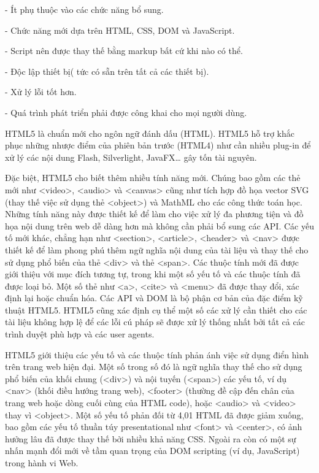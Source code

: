 \quad - Ít phụ thuộc vào các chức năng bổ sung.

\quad - Chức năng mới dựa trên HTML, CSS, DOM và JavaScript.

\quad - Script nên được thay thế bằng markup bất cứ khi nào có thể.

\quad - Độc lập thiết bị( tức có sẵn trên tất cả các thiết bị).

\quad - Xử lý lỗi tốt hơn.

\quad - Quá trình phát triển phải được công khai cho mọi người dùng.



HTML5 là chuẩn mới cho ngôn ngữ đánh dấu (HTML). HTML5 hỗ trợ khắc phục những nhược điểm của phiên bản trước (HTML4) như cần nhiều plug-in để xử lý các nội dung Flash, Silverlight, JavaFX… gây tốn tài nguyên.

Đặc biệt, HTML5 cho biết thêm nhiều tính năng mới. Chúng bao gồm các thẻ mới như <video>, <audio> và <canvas> cũng như tích hợp đồ họa vector SVG (thay thế việc sử dụng thẻ <object>) và MathML cho các công thức toán học. Những tính năng này được thiết kế để làm cho việc xử lý đa phương tiện và đồ họa nội dung trên web dễ dàng hơn mà không cần phải bổ sung các API. Các yếu tố mới khác, chẳng hạn như <section>, <article>, <header> và <nav> được thiết kế để làm phong phú thêm ngữ nghĩa nội dung của tài liệu và thay thế cho sử dụng phổ biến của thẻ <div> và thẻ <span>. Các thuộc tính mới đã được giới thiệu với mục đích tương tự, trong khi một số yếu tố và các thuộc tính đã được loại bỏ. Một số thẻ như <a>, <cite> và <menu> đã được thay đổi, xác định lại hoặc chuẩn hóa. Các API và DOM là bộ phận cơ bản của đặc điểm kỹ thuật HTML5. HTML5 cũng xác định cụ thể một số các xử lý cần thiết cho các tài liệu không hợp lệ để các lỗi cú pháp sẽ được xử lý thống nhất bởi tất cả các trình duyệt phù hợp và các user agents.

HTML5 giới thiệu các yếu tố và các thuộc tính phản ánh việc sử dụng điển hình trên trang web hiện đại. Một số trong số đó là ngữ nghĩa thay thế cho sử dụng phổ biến của khối chung (<div>) và nội tuyến (<span>) các yếu tố, ví dụ <nav> (khối điều hướng trang web), <footer> (thường đề cập đến chân của trang web hoặc dòng cuối cùng của HTML code), hoặc <audio> và <video> thay vì <object>. Một số yếu tố phản đối từ 4,01 HTML đã được giảm xuống, bao gồm các yếu tố thuần túy presentational như <font> và <center>, có ảnh hưởng lâu đã được thay thế bởi nhiều khả năng CSS. Ngoài ra còn có một sự nhấn mạnh đổi mới về tầm quan trọng của DOM scripting (ví dụ, JavaScript) trong hành vi Web.

